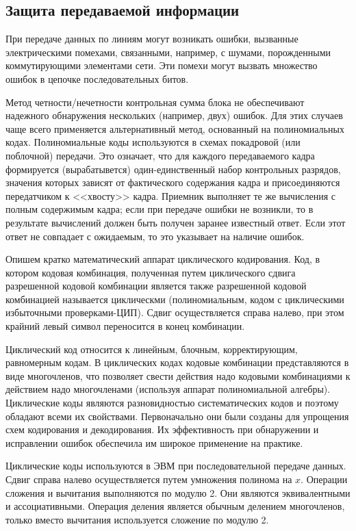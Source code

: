 \documentclass[russian,utf8,simple,emptystyle]{eskdtext}
\begin{document}
\subsection{Защита передаваемой информации}
При передаче данных по линиям могут возникать ошибки, вызванные электрическими помехами, связанными, например, с шумами, порожденными коммутирующими элементами сети. Эти помехи могут вызвать множество ошибок в цепочке последовательных битов.

Метод четности/нечетности контрольная сумма блока не обеспечивают надежного обнаружения нескольких (например, двух) ошибок. Для этих случаев чаще всего применяется альтернативный метод, основанный на полиномиальных кодах. Полиномиальные коды используются в схемах покадровой (или поблочной) передачи. Это означает, что для каждого передаваемого кадра формируется (вырабатывется) один-единственный набор контрольных разрядов, значения которых зависят от фактического содержания кадра и присоединяются передатчиком к <<хвосту>> кадра. Приемник выполняет те же вычисления с полным содержимым кадра; если при передаче ошибки не возникли, то в результате вычислений должен быть получен заранее известный ответ. Если этот ответ не совпадает с ожидаемым, то это указывает на наличие ошибок.

Опишем кратко математический аппарат циклического кодирования. Код, в котором кодовая комбинация, полученная путем циклического сдвига разрешенной кодовой комбинации является также разрешенной кодовой комбинацией называется циклическми (полиномиальным, кодом с циклическими избыточными проверками-ЦИП). Сдвиг осуществляется справа налево, при этом крайний левый символ переносится в конец комбинации. 

Циклический код относится к линейным, блочным, корректирующим, равномерным кодам. В циклических кодах кодовые комбинации представляются в виде многочленов, что позволяет свести действия надо кодовыми комбинациями к действием надо многочленами (используя аппарат полиномиальной алгебры). Циклические коды являются разновидностью систематических кодов и поэтому обладают всеми их свойствами. Первоначально они были созданы для упрощения схем кодирования и декодирования. Их эффективность при обнаружении и исправлении ошибок обеспечила им широкое применение на практике.

Циклические коды используются в ЭВМ при последовательной передаче данных. Сдвиг справа налево осуществляется путем умножения полинома на $x$. Операции сложения и вычитания выполняются по модулю 2. Они являются эквивалентными и ассоциативными. Операция деления является обычным делением многочленов, только вместо вычитания используется сложение по модулю 2.
\end{document}
